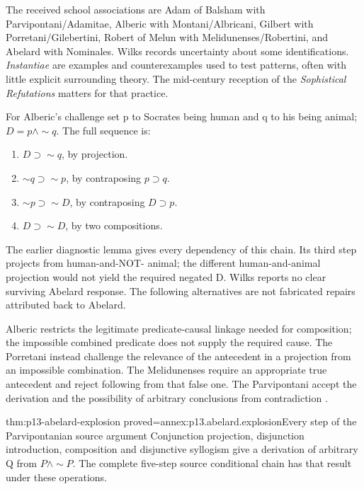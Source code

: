 The received school associations are Adam of Balsham with
Parvipontani/Adamitae, Alberic with Montani/Albricani,
Gilbert with Porretani/Gilebertini, Robert of Melun with
Melidunenses/Robertini, and Abelard with Nominales.
Wilks records uncertainty about some identifications.
\emph{Instantiae} are examples and counterexamples used
to test patterns, often with little explicit surrounding
theory. The mid-century reception of the
\emph{Sophistical Refutations} matters for that practice.

For Alberic's challenge set p to Socrates being human and
q to his being animal; \(D=p\land\sim q\).
The full sequence is:

\begin{enumerate}
\item \(D\supset\sim q\), by projection.
\item \(\sim q\supset\sim p\), by contraposing \(p\supset q\).
\item \(\sim p\supset\sim D\), by contraposing \(D\supset p\).
\item \(D\supset\sim D\), by two compositions.
\end{enumerate}

The earlier diagnostic lemma gives every dependency of
this chain. Its third step projects from human-and-NOT-
animal; the different human-and-animal projection would
not yield the required negated D.
Wilks reports no clear surviving Abelard response.
The following alternatives are not fabricated repairs
attributed back to Abelard.

Alberic restricts the legitimate predicate-causal linkage
needed for composition; the impossible combined predicate
does not supply the required cause.
The Porretani instead challenge the relevance of the
antecedent in a projection from an impossible combination.
The Melidunenses require an appropriate true antecedent
and reject following from that false one.
The Parvipontani accept the derivation and the possibility
of arbitrary conclusions from contradiction
\cite[pp.~142--145]{Wilks2007FordhamAbelard}.

\begin{hblemma}{thm:p13-abelard-explosion}
 {proved=annex:p13.abelard.explosion}{Every step of the Parvipontanian source argument}
Conjunction projection, disjunction introduction, composition
and disjunctive syllogism give a derivation of arbitrary Q
from \(P\land\sim P\). The complete five-step source
conditional chain has that result under these operations.
\end{hblemma}

